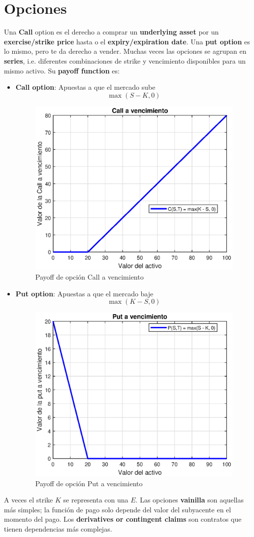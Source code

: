 

\section{Opciones}
Una \textbf{Call} option es el derecho a comprar un \textbf{underlying asset} por un \textbf{exercise/strike price} hasta o el \textbf{expiry/expiration date}. Una \textbf{put option} es lo mismo, pero te da derecho a vender. Muchas veces las opciones se agrupan en \textbf{series}, i.e. diferentes combinaciones de strike y vencimiento disponibles para un mismo activo. Su \textbf{payoff function} es:
\begin{itemize}
    \item \textbf{Call option}: Apuestas a que el mercado sube
    \[\max(S-K, 0)\]
    \begin{figure}[H]
        \centering
        \includegraphics[width=0.5\linewidth]{Imagenes/2_Derivados/PayOffCall.eps}
        \caption{Payoff de opción Call a vencimiento}
    \end{figure}
    \item \textbf{Put option}: Apuestas a que el mercado baje
    \[\max(K-S, 0)\]
    \begin{figure}[H]
        \centering
        \includegraphics[width=0.5\linewidth]{Imagenes/2_Derivados/PayOffPut.eps}
        \caption{Payoff de opción Put a vencimiento}
    \end{figure}
\end{itemize}
A veces el strike $K$ se representa con una $E$. Las opciones \textbf{vainilla} son aquellas más simples; la función de pago solo depende del valor del subyacente en el momento del pago. Los \textbf{derivatives or contingent claims} son contratos que tienen dependencias más complejas.


